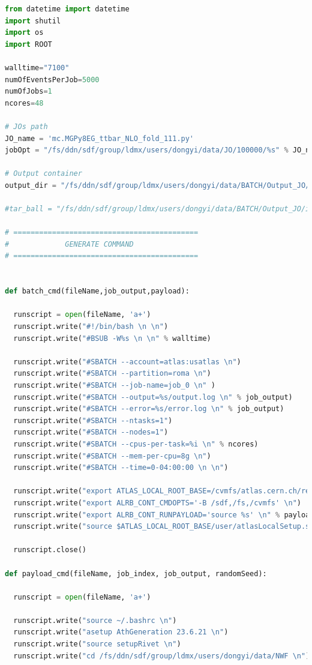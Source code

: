 \documentclass[NOTE, REPORT=true, atlasdraft=true, USenglish]{atlasdoc}
\begin{document}
\begin{lstlisting}[language=Python, caption=Job Configuration python script]
from datetime import datetime
import shutil
import os
import ROOT

walltime="7100"
numOfEventsPerJob=5000
numOfJobs=1
ncores=48

# JOs path
JO_name = 'mc.MGPy8EG_ttbar_NLO_fold_111.py'
jobOpt = "/fs/ddn/sdf/group/ldmx/users/dongyi/data/JO/100000/%s" % JO_name

# Output container
output_dir = "/fs/ddn/sdf/group/ldmx/users/dongyi/data/BATCH/Output_JO/test_1"

#tar_ball = "/fs/ddn/sdf/group/ldmx/users/dongyi/data/BATCH/Output_JO/integration_tqz_NLO_5FS_221/output/job_0/999999/mc_13TeV.MGPy8EG_tllq_5FS_HT6_NLO_211.GRID.tar.gz"

# ===========================================
#             GENERATE COMMAND
# ===========================================


def batch_cmd(fileName,job_output,payload):

  runscript = open(fileName, 'a+')
  runscript.write("#!/bin/bash \n \n")
  runscript.write("#BSUB -W%s \n \n" % walltime)

  runscript.write("#SBATCH --account=atlas:usatlas \n")
  runscript.write("#SBATCH --partition=roma \n")
  runscript.write("#SBATCH --job-name=job_0 \n" )
  runscript.write("#SBATCH --output=%s/output.log \n" % job_output)
  runscript.write("#SBATCH --error=%s/error.log \n" % job_output)
  runscript.write("#SBATCH --ntasks=1")
  runscript.write("#SBATCH --nodes=1")
  runscript.write("#SBATCH --cpus-per-task=%i \n" % ncores)
  runscript.write("#SBATCH --mem-per-cpu=8g \n")
  runscript.write("#SBATCH --time=0-04:00:00 \n \n") 
  
  runscript.write("export ATLAS_LOCAL_ROOT_BASE=/cvmfs/atlas.cern.ch/repo/ATLASLocalRootBase \n")
  runscript.write("export ALRB_CONT_CMDOPTS='-B /sdf,/fs,/cvmfs' \n")
  runscript.write("export ALRB_CONT_RUNPAYLOAD='source %s' \n" % payload)
  runscript.write("source $ATLAS_LOCAL_ROOT_BASE/user/atlasLocalSetup.sh -c centos7 \n")

  runscript.close()

def payload_cmd(fileName, job_index, job_output, randomSeed):
  
  runscript = open(fileName, 'a+')
  
  runscript.write("source ~/.bashrc \n")
  runscript.write("asetup AthGeneration 23.6.21 \n")
  runscript.write("source setupRivet \n")
  runscript.write("cd /fs/ddn/sdf/group/ldmx/users/dongyi/data/NWF \n")


\end{lstlisting}
\end{document}
